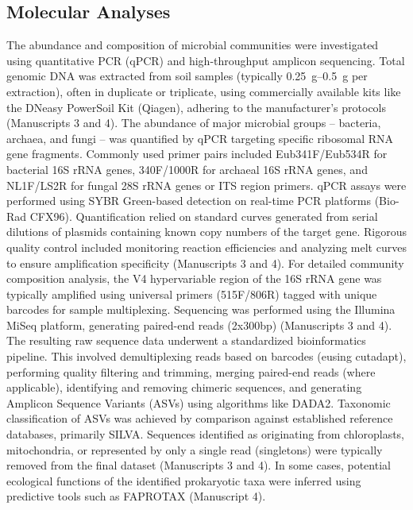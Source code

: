 \subsection{Molecular Analyses}

The abundance and composition of microbial communities were investigated using quantitative PCR (qPCR) and high-throughput amplicon sequencing. Total genomic DNA was extracted from soil samples (typically \SIrange[range-phrase=--,range-units=single]{0.25}{0.5}{\gram} per extraction), often in duplicate or triplicate, using commercially available kits like the DNeasy PowerSoil Kit (Qiagen), adhering to the manufacturer's protocols (Manuscripts 3 and 4). The abundance of major microbial groups – bacteria, archaea, and fungi – was quantified by qPCR targeting specific ribosomal RNA gene fragments. Commonly used primer pairs included Eub341F/Eub534R for bacterial 16S rRNA genes, 340F/1000R for archaeal 16S rRNA genes, and NL1F/LS2R for fungal 28S rRNA genes or ITS region primers. qPCR assays were performed using SYBR Green-based detection on real-time PCR platforms (Bio-Rad CFX96). Quantification relied on standard curves generated from serial dilutions of plasmids containing known copy numbers of the target gene. Rigorous quality control included monitoring reaction efficiencies and analyzing melt curves to ensure amplification specificity (Manuscripts 3 and 4). For detailed community composition analysis, the V4 hypervariable region of the 16S rRNA gene was typically amplified using universal primers (515F/806R) tagged with unique barcodes for sample multiplexing. Sequencing was performed using the Illumina MiSeq platform, generating paired-end reads (2x300bp) (Manuscripts 3 and 4). The resulting raw sequence data underwent a standardized bioinformatics pipeline. This involved demultiplexing reads based on barcodes (eusing cutadapt), performing quality filtering and trimming, merging paired-end reads (where applicable), identifying and removing chimeric sequences, and generating Amplicon Sequence Variants (ASVs) using algorithms like DADA2. Taxonomic classification of ASVs was achieved by comparison against established reference databases, primarily SILVA. Sequences identified as originating from chloroplasts, mitochondria, or represented by only a single read (singletons) were typically removed from the final dataset (Manuscripts 3 and 4). In some cases, potential ecological functions of the identified prokaryotic taxa were inferred using predictive tools such as FAPROTAX (Manuscript 4).

